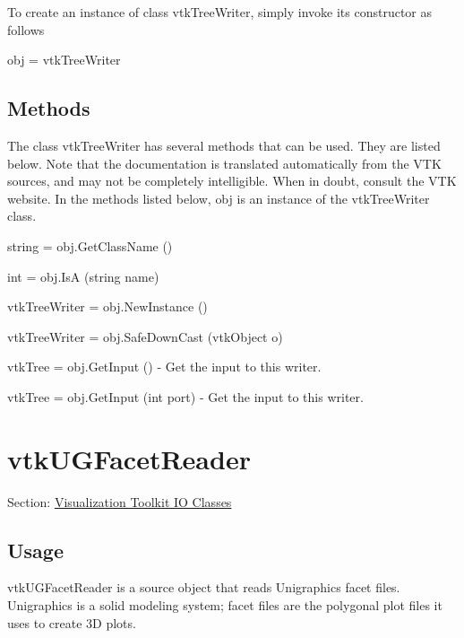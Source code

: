 To create an instance of class vtk\-Tree\-Writer, simply invoke its constructor as follows \begin{DoxyVerb}  obj = vtkTreeWriter
\end{DoxyVerb}
 \hypertarget{vtkwidgets_vtkxyplotwidget_Methods}{}\subsection{Methods}\label{vtkwidgets_vtkxyplotwidget_Methods}
The class vtk\-Tree\-Writer has several methods that can be used. They are listed below. Note that the documentation is translated automatically from the V\-T\-K sources, and may not be completely intelligible. When in doubt, consult the V\-T\-K website. In the methods listed below, {\ttfamily obj} is an instance of the vtk\-Tree\-Writer class. 
\begin{DoxyItemize}
\item {\ttfamily string = obj.\-Get\-Class\-Name ()}  
\item {\ttfamily int = obj.\-Is\-A (string name)}  
\item {\ttfamily vtk\-Tree\-Writer = obj.\-New\-Instance ()}  
\item {\ttfamily vtk\-Tree\-Writer = obj.\-Safe\-Down\-Cast (vtk\-Object o)}  
\item {\ttfamily vtk\-Tree = obj.\-Get\-Input ()} -\/ Get the input to this writer.  
\item {\ttfamily vtk\-Tree = obj.\-Get\-Input (int port)} -\/ Get the input to this writer.  
\end{DoxyItemize}\hypertarget{vtkio_vtkugfacetreader}{}\section{vtk\-U\-G\-Facet\-Reader}\label{vtkio_vtkugfacetreader}
Section\-: \hyperlink{sec_vtkio}{Visualization Toolkit I\-O Classes} \hypertarget{vtkwidgets_vtkxyplotwidget_Usage}{}\subsection{Usage}\label{vtkwidgets_vtkxyplotwidget_Usage}
vtk\-U\-G\-Facet\-Reader is a source object that reads Unigraphics facet files. Unigraphics is a solid modeling system; facet files are the polygonal plot files it uses to create 3\-D plots.

